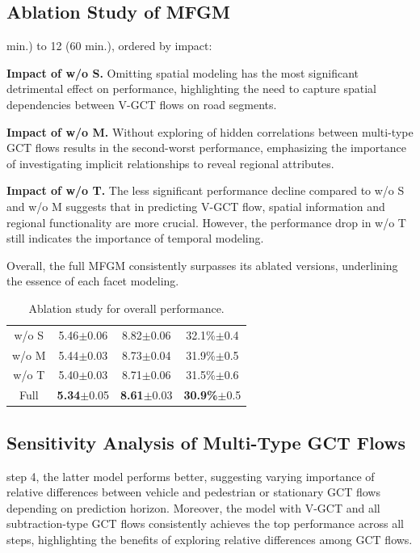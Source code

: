 \documentclass[letterpaper]{article} %
\begin{document}
\subsection{Ablation Study of MFGM}
 min.) to 12 (60 min.), ordered by impact:

\noindent \textbf{Impact of w/o S.} Omitting spatial modeling has the most significant detrimental effect on performance, highlighting the need to capture spatial dependencies between V-GCT flows on road segments.

\noindent \textbf{Impact of w/o M.} Without exploring of hidden correlations between multi-type GCT flows results in the second-worst performance, emphasizing the importance of investigating implicit relationships to reveal regional attributes.

\noindent \textbf{Impact of w/o T.} The less significant performance decline compared to w/o S and w/o M suggests that in predicting V-GCT flow, spatial information and regional functionality are more crucial. However, the performance drop in w/o T still indicates the importance of temporal modeling.

\noindent Overall, the full MFGM consistently surpasses its ablated versions, underlining the essence of each facet modeling.
\begin{table}[h]
  \small
  \centering

  \begin{tabular}{c|ccc}
    \hline
    \hline
    w/o S &  {5.46}$\pm$0.06	& {8.82}$\pm$0.06 & {32.1\%}$\pm$0.4 \\
    w/o M &  {5.44}$\pm$0.03	& {8.73}$\pm$0.04 & {31.9\%}$\pm$0.5 \\
    w/o T &  {5.40}$\pm$0.03	& {8.71}$\pm$0.06 & {31.5\%}$\pm$0.6 \\
    Full &  \textbf{5.34}$\pm$0.05	& \textbf{8.61}$\pm$0.03 & \textbf{30.9\%}$\pm$0.5 \\
    \hline
  \end{tabular}
  \caption{Ablation study for overall performance.}
  \label{table:ablation}
\end{table}
\subsection{Sensitivity Analysis of Multi-Type GCT Flows}
 step 4, the latter model performs better, suggesting varying importance of relative differences between vehicle and pedestrian or stationary GCT flows depending on prediction horizon. Moreover, the model with V-GCT and all subtraction-type GCT flows consistently achieves the top performance across all steps, highlighting the benefits of exploring relative differences among GCT flows.
\end{document}
